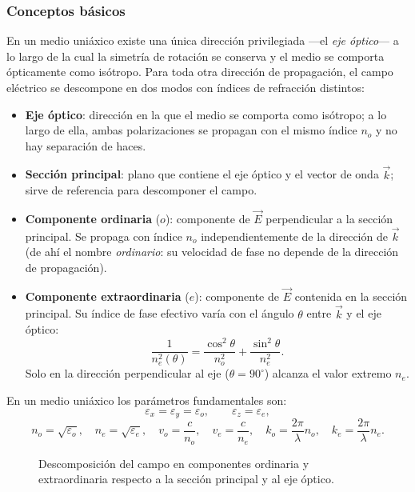 \documentclass[12pt, a4paper]{article}
\theoremstyle{plain}
\theoremstyle{definition}
\theoremstyle{remark}
\newcommand{\ve}[1]{\vec{#1}}
\begin{document}
\subsubsection{Conceptos básicos}

En un medio uniáxico existe una única dirección privilegiada —el
\emph{eje óptico}— a lo largo de la cual la simetría de rotación se
conserva y el medio se comporta ópticamente como isótropo. Para toda
otra dirección de propagación, el campo eléctrico se descompone en dos
modos con índices de refracción distintos:

\begin{itemize}
  \item \textbf{Eje óptico}: dirección en la que el medio se comporta como
        isótropo; a lo largo de ella, ambas polarizaciones se propagan con
        el mismo índice $n_o$ y no hay separación de haces.
  \item \textbf{Sección principal}: plano que contiene el eje óptico y el
        vector de onda $\ve{k}$; sirve de referencia para descomponer el
        campo.
  \item \textbf{Componente ordinaria} ($o$): componente de $\ve{E}$
        perpendicular a la sección principal. Se propaga con índice $n_o$
        independientemente de la dirección de $\ve{k}$ (de ahí el nombre
        \emph{ordinario}: su velocidad de fase no depende de la dirección
        de propagación).
  \item \textbf{Componente extraordinaria} ($e$): componente de $\ve{E}$
        contenida en la sección principal. Su índice de fase efectivo varía
        con el ángulo $\theta$ entre $\ve{k}$ y el eje óptico:
        \[
          \frac{1}{n_e^2(\theta)}
          = \frac{\cos^2\theta}{n_o^2}+\frac{\sin^2\theta}{n_e^2}.
        \]
        Solo en la dirección perpendicular al eje ($\theta=90^\circ$) alcanza
        el valor extremo $n_e$.
\end{itemize}

En un medio uniáxico los parámetros fundamentales son:
\[
  \varepsilon_x=\varepsilon_y=\varepsilon_o,\qquad
  \varepsilon_z=\varepsilon_e,
\]
\[
  n_o=\sqrt{\varepsilon_o},\quad
  n_e=\sqrt{\varepsilon_e},\quad
  v_o=\frac{c}{n_o},\quad
  v_e=\frac{c}{n_e},\quad
  k_o=\frac{2\pi}{\lambda}n_o,\quad
  k_e=\frac{2\pi}{\lambda}n_e.
\]

\begin{figure}[H]
  \centering
  \caption{Descomposición del campo en componentes ordinaria y extraordinaria
           respecto a la sección principal y al eje óptico.}
  \label{fig:uniaxico_componentes}
\end{figure}
\end{document}
